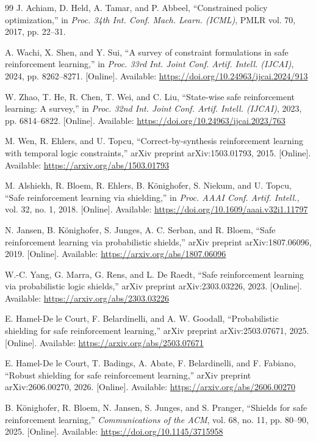 \documentclass[12pt,a4paper]{article}
\begin{document}
\begin{thebibliography}{99}
 J. Achiam, D. Held, A. Tamar, and P. Abbeel, ``Constrained policy optimization,'' in \emph{Proc. 34th Int. Conf. Mach. Learn. (ICML)}, PMLR vol. 70, 2017, pp. 22--31.

 A. Wachi, X. Shen, and Y. Sui, ``A survey of constraint formulations in safe reinforcement learning,'' in \emph{Proc. 33rd Int. Joint Conf. Artif. Intell. (IJCAI)}, 2024, pp. 8262--8271. [Online]. Available: \url{https://doi.org/10.24963/ijcai.2024/913}

 W. Zhao, T. He, R. Chen, T. Wei, and C. Liu, ``State-wise safe reinforcement learning: A survey,'' in \emph{Proc. 32nd Int. Joint Conf. Artif. Intell. (IJCAI)}, 2023, pp. 6814--6822. [Online]. Available: \url{https://doi.org/10.24963/ijcai.2023/763}

 M. Wen, R. Ehlers, and U. Topcu, ``Correct-by-synthesis reinforcement learning with temporal logic constraints,'' arXiv preprint arXiv:1503.01793, 2015. [Online]. Available: \url{https://arxiv.org/abs/1503.01793}

 M. Alshiekh, R. Bloem, R. Ehlers, B. K\"{o}nighofer, S. Niekum, and U. Topcu, ``Safe reinforcement learning via shielding,'' in \emph{Proc. AAAI Conf. Artif. Intell.}, vol. 32, no. 1, 2018. [Online]. Available: \url{https://doi.org/10.1609/aaai.v32i1.11797}

 N. Jansen, B. K\"{o}nighofer, S. Junges, A. C. Serban, and R. Bloem, ``Safe reinforcement learning via probabilistic shields,'' arXiv preprint arXiv:1807.06096, 2019. [Online]. Available: \url{https://arxiv.org/abs/1807.06096}

 W.-C. Yang, G. Marra, G. Rens, and L. De Raedt, ``Safe reinforcement learning via probabilistic logic shields,'' arXiv preprint arXiv:2303.03226, 2023. [Online]. Available: \url{https://arxiv.org/abs/2303.03226}

 E. Hamel-De le Court, F. Belardinelli, and A. W. Goodall, ``Probabilistic shielding for safe reinforcement learning,'' arXiv preprint arXiv:2503.07671, 2025. [Online]. Available: \url{https://arxiv.org/abs/2503.07671}

 E. Hamel-De le Court, T. Badings, A. Abate, F. Belardinelli, and F. Fabiano, ``Robust shielding for safe reinforcement learning,'' arXiv preprint arXiv:2606.00270, 2026. [Online]. Available: \url{https://arxiv.org/abs/2606.00270}

 B. K\"{o}nighofer, R. Bloem, N. Jansen, S. Junges, and S. Pranger, ``Shields for safe reinforcement learning,'' \emph{Communications of the ACM}, vol. 68, no. 11, pp. 80--90, 2025. [Online]. Available: \url{https://doi.org/10.1145/3715958}


\end{thebibliography}
\end{document}
